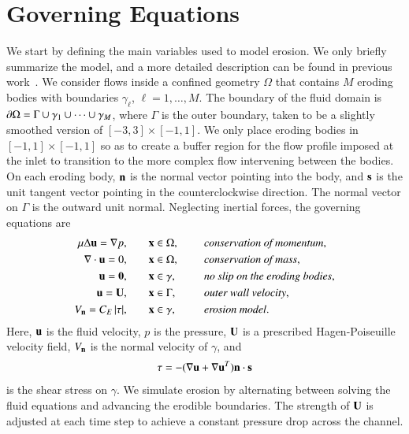 \documentclass[preprint,10pt]{elsarticle}
\begin{document}
\section{Governing Equations}
\label{sec:formulation}
We start by defining the main variables used to model erosion.  We only
briefly summarize the model, and a more detailed description can be
found in previous work~\cite{qua-moo2018}.  We consider flows inside a
confined geometry $\Omega$ that contains $M$ eroding bodies with
boundaries $\gamma_\ell$, $\ell = 1,\ldots,M$.  The boundary of the
fluid domain is $\bd \Omega = \Gamma \cup \gamma_1 \cup \cdots \cup
\gamma_M$, where $\Gamma$ is the outer boundary, taken to be a slightly
smoothed version of $[-3,3] \times [-1,1]$.  We only place eroding
bodies in $[-1,1] \times [-1,1]$ so as to create a buffer region for the
flow profile imposed at the inlet to transition to the more complex flow
intervening between the bodies. On each eroding body, $\nn$ is the
normal vector pointing into the body, and $\ss$ is the unit tangent
vector pointing in the counterclockwise direction.  The normal vector on
$\Gamma$ is the outward unit normal.  Neglecting inertial forces, the
governing equations are
\begin{equation}
\label{eqn:erosionModel}
  \begin{split}
    \mu \Delta \uu = \grad p, &\hspace{20pt} \xx \in \Omega, \gap 
      &&\mbox{\em conservation of momentum}, \\
    \grad \cdot \uu = 0, &\hspace{20pt} \xx \in \Omega, \gap 
      &&\mbox{\em conservation of mass}, \\
    \uu = \mathbf{0}, &\hspace{20pt} \xx \in \gamma, \gap 
      &&\mbox{\em no slip on the eroding bodies}, \\
    \uu = \UU, &\hspace{20pt} \xx \in \Gamma, \gap 
      &&\mbox{\em outer wall velocity}, \\
    \Vn = \CE \, \abs{\tau}, &\hspace{20pt} \xx \in \gamma,
      &&\mbox{\em erosion model}.
  \end{split}
\end{equation}
Here, $\uu$ is the fluid velocity, $p$ is the pressure, $\UU$ is a
prescribed Hagen-Poiseuille velocity field, $\Vn$ is the normal velocity
of $\gamma$, and
\begin{align}
  \tau = -(\nabla \uu + \nabla \uu^T) \nn \cdot \ss
  \label{eqn:shearStress}
\end{align}
is the shear stress on $\gamma$. We simulate erosion by alternating
between solving the fluid equations and advancing the erodible
boundaries. The strength of $\UU$ is adjusted at each time step to
achieve a constant pressure drop across the channel.
\end{document}
